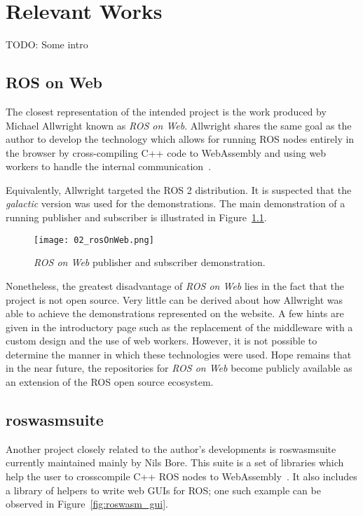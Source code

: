 \chapter{Relevant Works}

    TODO: Some intro


    \section{ROS on Web}

        The closest representation of the intended project is the work produced by Michael Allwright known as \textit{ROS on Web}. Allwright shares the same goal as the author to develop the technology which allows for running ROS nodes entirely in the browser by cross-compiling C++ code to WebAssembly and using web workers to handle the internal communication~\cite{rosonweb}.

        Equivalently, Allwright targeted the \ac{ROS} 2 distribution. It is suspected that the \textit{galactic} version was used for the demonstrations. The main demonstration of a running publisher and subscriber is illustrated in Figure~\ref{fig:rosonweb}.
        
        
        \begin{figure}[htbp]
            \centering
            \texttt{[image: 02\_rosOnWeb.png]}
            \caption{\textit{ROS on Web} publisher and subscriber demonstration.}
            \label{fig:rosonweb}
        \end{figure}

        Nonetheless, the greatest disadvantage of \textit{ROS on Web} lies in the fact that the project is not open source. Very little can be derived about how Allwright was able to achieve the demonstrations represented on the website. A few hints are given in the introductory page such as the replacement of the middleware with a custom design and the use of web workers. However, it is not possible to determine the manner in which these technologies were used. Hope remains that in the near future, the repositories for \textit{ROS on Web} become publicly available as an extension of the ROS open source ecosystem.

    \section{roswasm\smallunderscore  suite}

        Another project closely related to the author's developments is \textsf{roswasm\smallunderscore  suite} currently maintained mainly by Nils Bore. This suite is a set of libraries which help the user to cross\-compile C++ ROS nodes to WebAssembly~\cite{roswasmsuite}. It also includes a library of helpers to write web \ac{GUI}s for ROS; one such example can be observed in Figure~\ref{fig:roswasm_gui}.

